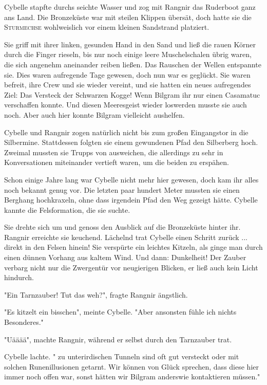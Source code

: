 Cybelle stapfte durchs seichte Wasser und zog mit Rangnir das Ruderboot ganz ans Land. Die Bronzeküste war mit steilen Klippen übersät, doch hatte sie die \textsc{Sturmechse} wohlweislich vor einem kleinen Sandstrand platziert. 

Sie griff mit ihrer linken, gesunden Hand in den Sand und ließ die rauen Körner durch die Finger rieseln, bis nur noch einige leere Muschelschalen übrig waren, die sich angenehm aneinander reiben ließen. Das Rauschen der Wellen entspannte sie. Dies waren aufregende Tage gewesen, doch nun war es geglückt. Sie waren befreit, ihre Crew und sie wieder vereint, und sie hatten ein neues aufregendes Ziel: Das Versteck der Schwarzen Kogge! Wenn Bilgram ihr nur einen Casamatuc verschaffen konnte. Und diesen Meeresgeist wieder loswerden musste sie auch noch. Aber auch hier konnte Bilgram vielleicht aushelfen.

Cybelle und Rangnir zogen natürlich nicht bis zum großen Eingangstor in die Silbermine. Stattdessen folgten sie einem gewundenen Pfad den Silberberg hoch. Zweimal mussten sie Trupps von  ausweichen, die allerdings zu sehr in Konversationen miteinander vertieft waren, um die beiden  zu erspähen. 

Schon einige Jahre lang war Cybelle nicht mehr hier gewesen, doch kam ihr alles noch bekannt genug vor. Die letzten paar hundert Meter mussten sie einen Berghang hochkraxeln, ohne dass irgendein Pfad den Weg gezeigt hätte. Cybelle kannte die Felsformation, die sie suchte. 

Sie drehte sich um und genoss den Ausblick auf die Bronzeküste hinter ihr. Rangnir erreichte sie keuchend. Lächelnd trat Cybelle einen Schritt zurück ... direkt in den Felsen hinein! Sie verspürte ein leichtes Kitzeln, als ginge man durch einen dünnen Vorhang aus kaltem Wind. Und dann: Dunkelheit! Der Zauber verbarg nicht nur die Zwergentür vor neugierigen Blicken, er ließ auch kein Licht hindurch.


"Ein Tarnzauber! Tut das weh?", fragte Rangnir ängstlich.
      
"Es kitzelt ein bisschen", meinte Cybelle. "Aber ansonsten fühle ich nichts Besonderes."

"Uääää", machte Rangnir, während er selbst durch den Tarnzauber trat.

Cybelle lachte. " zu unterirdischen Tunneln sind oft gut versteckt oder mit solchen Runenillusionen getarnt. Wir können von Glück sprechen, dass diese hier immer noch offen war, sonst hätten wir Bilgram anderswie kontaktieren müssen."

